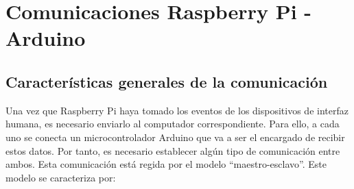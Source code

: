 \begin{itemize}
\end{itemize}














\clearpage

\section{Comunicaciones Raspberry Pi - Arduino} \label{s2_3}

\subsection{Características generales de la comunicación} \label{s2_3_1}

Una vez que Raspberry Pi haya tomado los eventos de los dispositivos de interfaz humana, es necesario enviarlo al computador correspondiente. Para ello, a cada uno se conecta un microcontrolador Arduino que va a ser el encargado de recibir estos datos. Por tanto, es necesario establecer algún tipo de comunicación entre ambos. Esta comunicación está regida por el modelo ``maestro-esclavo''. Este modelo se caracteriza por:

